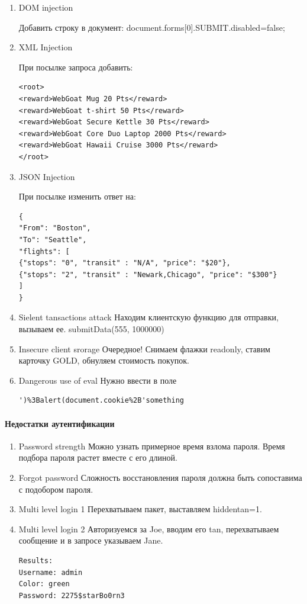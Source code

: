 \documentclass[10pt,a4paper]{article}
\begin{document}
\begin{enumerate}
\item DOM injection

Добавить строку в документ:
document.forms[0].SUBMIT.disabled=false;

\item XML Injection

При посылке запроса добавить:
\begin{verbatim}
<root>
<reward>WebGoat Mug 20 Pts</reward>
<reward>WebGoat t-shirt 50 Pts</reward>
<reward>WebGoat Secure Kettle 30 Pts</reward>
<reward>WebGoat Core Duo Laptop 2000 Pts</reward>
<reward>WebGoat Hawaii Cruise 3000 Pts</reward>
</root>
\end{verbatim}


\item JSON Injection

При посылке изменить ответ на:

\begin{verbatim}
{
"From": "Boston",
"To": "Seattle", 
"flights": [
{"stops": "0", "transit" : "N/A", "price": "$20"},
{"stops": "2", "transit" : "Newark,Chicago", "price": "$300"} 
]
}
\end{verbatim}
\item Sielent tansactions attack
Находим клиентскую функцию для отправки, вызываем ее.
submitData(555, 1000000)
\item Insecure client srorage
Очередное!
Снимаем флажки readonly, ставим карточку GOLD, обнуляем стоимость покупок.
\item Dangerous use of eval
Нужно ввести в поле
\begin{verbatim}
')%3Balert(document.cookie%2B'something
\end{verbatim}
\end{enumerate}
\paragraph{Недостатки аутентификации}
\begin{enumerate}
\item Password strength
Можно узнать примерное время взлома пароля. Время подбора пароля растет вместе с его длиной.
\item Forgot password
Сложность восстановления пароля должна быть сопоставима с подобором пароля.
\item Multi level login 1
Перехватываем пакет, выставляем hiddentan=1.
\item Multi level login 2
Авторизуемся за Joe, вводим его tan, перехватываем сообщение и в запросе указываем Jane.
\begin{verbatim}
Results:
Username: admin
Color: green
Password: 2275$starBo0rn3
\end{verbatim}
\end{enumerate}
\end{document}
